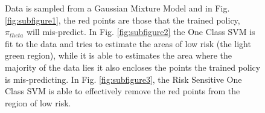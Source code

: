 \documentclass[10pt, conference]{ieeeconf}      %
\begin{document}
\begin{figure}[ht]
\centering
{}
\quad
{}

\caption{Data is sampled from a Gaussian Mixture Model and in Fig. \ref{fig:subfigure1}, the red points are those that the trained policy, $\pi_{theta}$ will mis-predict. In Fig. \ref{fig:subfigure2} the One Class SVM is fit to the data and tries to estimate the areas of low risk (the light green region), while it is able to estimates the area where the majority of the data lies it also encloses the points the trained policy is mis-predicting. In Fig. \ref{fig:subfigure3}, the Risk Sensitive One Class SVM is able to effectively remove the red points from the region of low risk.}
\label{fig:support_example}
\end{figure}
\end{document}
